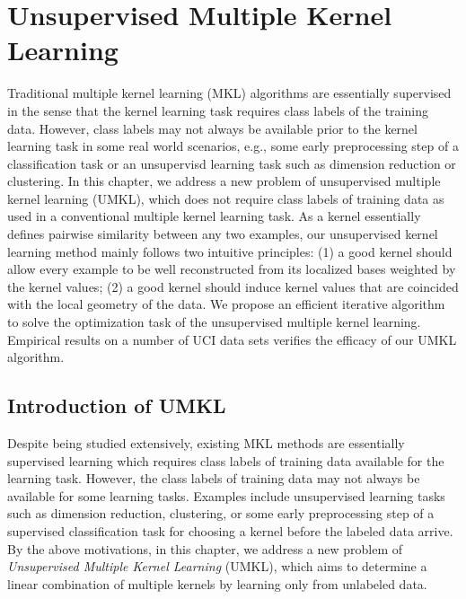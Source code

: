 
\def\k{{\mathcal K}}
\def\h{{\mathcal H}}
\def\d{{\bf d}}
\def\K{{\bf K}}
\def\M{{\bf M}}
\def\I{{\bf I}}
\def\U{{\bf U}}
\def\u{{\bf u}}
\def\v{{\bf v}}
\def\a{{\alpha}}
\def\ba{{\bm\alpha}}
\def\eu{{\widehat{\u}_n}}
\def\X{{\mathbf X}}
\def\D{{\mathbf D}}
\def\conv{{\mbox{conv}}}
\def\pd{{\succ\0}}
\def\rk{{\mbox{r}}}
\def\r{{\mathbb R}}
\def\e{{\mathbb E}}
\def\p{{\mathbb P}}
\def\n{{\mathbb N}}

\chapter{Unsupervised Multiple Kernel Learning}


Traditional multiple kernel learning (MKL) algorithms are essentially supervised in the sense that the kernel learning task requires class labels of the training data. However, class labels may not always be available prior to the kernel learning task in some real world scenarios, e.g., some early preprocessing step of a classification task or an unsupervisd learning task such as dimension reduction or clustering. In this chapter, we address a new problem of unsupervised multiple kernel learning (UMKL), which does not require class labels of training data as used in a conventional multiple kernel learning task. As a kernel essentially defines pairwise similarity between any two examples, our unsupervised kernel learning method mainly follows two intuitive principles: (1) a good kernel should allow every example to be well reconstructed from its localized bases weighted by the kernel values; (2) a good kernel should induce kernel values that are coincided with the local geometry of the data. We propose an efficient iterative algorithm to solve the optimization task of the unsupervised multiple kernel learning. Empirical results on a number of UCI data sets verifies the efficacy of our UMKL algorithm.

\section{Introduction of UMKL}

Despite being studied extensively, existing MKL methods are essentially supervised learning which requires class labels of training data available for the learning task. However, the class labels of training data may not always be available for some learning tasks. Examples include unsupervised learning tasks such as dimension reduction, clustering, or some early preprocessing step of a supervised classification task for choosing a kernel before the labeled data arrive. By the above motivations, in this chapter, we address a new problem of {\em Unsupervised Multiple Kernel Learning} (UMKL), which aims to determine a linear combination of multiple kernels by learning only from unlabeled data.

